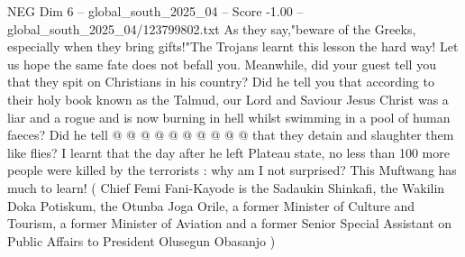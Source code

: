 \begin{textsample}{NEG Dim 6 – global\_south\_2025\_04 – Score -1.00 – global\_south\_2025\_04/123799802.txt}
As they say,"beware of the Greeks, especially when they bring gifts!"The Trojans learnt this lesson the hard way!
Let us hope the same fate does not befall you.
Meanwhile, did your guest tell you that they spit on Christians in his country?
Did he tell you that according to their holy book known as the Talmud, our Lord and Saviour Jesus Christ was a liar and a rogue and is now burning in hell whilst swimming in a pool of human faeces?
Did he tell @ @ @ @ @ @ @ @ @ @ that they detain and slaughter them like flies?
I learnt that the day after he left Plateau state, no less than 100 more people were killed by the terrorists : why am I not surprised?
This Muftwang has much to learn! ( Chief Femi Fani-Kayode is the Sadaukin Shinkafi, the Wakilin Doka Potiskum, the Otunba Joga Orile, a former Minister of Culture and Tourism, a former Minister of Aviation and a former Senior Special Assistant on Public Affairs to President Olusegun Obasanjo )

\end{textsample}
